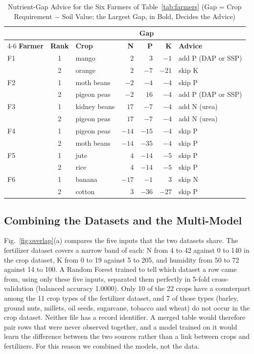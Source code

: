 \documentclass[conference]{IEEEtran}
\begin{document}
\begin{table}[htbp]
\caption{Nutrient-Gap Advice for the Six Farmers of Table~\ref{tab:farmers} (Gap = Crop Requirement $-$ Soil Value; the Largest Gap, in Bold, Decides the Advice)}
\label{tab:gap}
\centering
\footnotesize
\setlength{\tabcolsep}{3pt}
\begin{tabular}{@{}lcl rrr l@{}}
\toprule
 & & & \multicolumn{3}{c}{\textbf{Gap}} & \\
\cmidrule(lr){4-6}
\textbf{Farmer} & \textbf{Rank} & \textbf{Crop} & \textbf{N} & \textbf{P} & \textbf{K} & \textbf{Advice} \\
\midrule
F1 & 1 & mango & $2$ & \textbf{$3$} & $-1$ & add P (DAP or SSP) \\
 & 2 & orange & $2$ & $-7$ & \textbf{$-21$} & skip K \\
F2 & 1 & moth beans & $-2$ & \textbf{$-4$} & $-4$ & skip P \\
 & 2 & pigeon peas & $-2$ & \textbf{$16$} & $-4$ & add P (DAP or SSP) \\
F3 & 1 & kidney beans & \textbf{$17$} & $-7$ & $-4$ & add N (urea) \\
 & 2 & pigeon peas & \textbf{$17$} & $-7$ & $-4$ & add N (urea) \\
F4 & 1 & pigeon peas & $-14$ & \textbf{$-15$} & $-4$ & skip P \\
 & 2 & moth beans & $-14$ & \textbf{$-35$} & $-4$ & skip P \\
F5 & 1 & jute & $4$ & \textbf{$-14$} & $-5$ & skip P \\
 & 2 & rice & $4$ & \textbf{$-14$} & $-5$ & skip P \\
F6 & 1 & banana & \textbf{$-17$} & $-1$ & $3$ & skip N \\
 & 2 & cotton & $3$ & \textbf{$-36$} & $-27$ & skip P \\
\bottomrule
\end{tabular}
\end{table}

\subsection{Combining the Datasets and the Multi-Model}

Fig.~\ref{fig:overlap}(a) compares the five inputs that the two datasets share. The fertilizer dataset covers a narrow band of each: N from 4 to 42 against 0 to 140 in the crop dataset, K from 0 to 19 against 5 to 205, and humidity from 50 to 72 against 14 to 100. A Random Forest trained to tell which dataset a row came from, using only these five inputs, separated them perfectly in 5-fold cross-validation (balanced accuracy 1.0000). Only 10 of the 22 crops have a counterpart among the 11 crop types of the fertilizer dataset, and 7 of those types (barley, ground nuts, millets, oil seeds, sugarcane, tobacco and wheat) do not occur in the crop dataset. Neither file has a record identifier. A merged table would therefore pair rows that were never observed together, and a model trained on it would learn the difference between the two sources rather than a link between crops and fertilizers. For this reason we combined the models, not the data.
\end{document}

